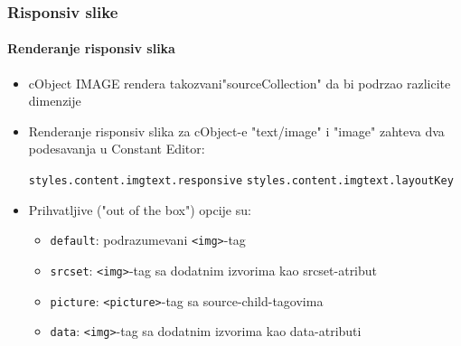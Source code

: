 \begin{frame}[fragile]
	\frametitle{Risponsiv slike}
	\framesubtitle{Renderanje risponsiv slika}

	\begin{itemize}
		\item cObject IMAGE rendera takozvani"sourceCollection" da bi podrzao razlicite dimenzije
		\item Renderanje risponsiv slika za cObject-e "text/image" i "image" zahteva dva podesavanja u Constant Editor:

			\texttt{styles.content.imgtext.responsive}\newline
			\texttt{styles.content.imgtext.layoutKey}

		\item Prihvatljive ("out of the box") opcije su:

			\begin{itemize}
				\item \texttt{default}:	\tabto{2cm} podrazumevani \texttt{<img>}-tag
				\item \texttt{srcset}:	\tabto{2cm} \texttt{<img>}-tag sa dodatnim izvorima kao srcset-atribut
				\item \texttt{picture}:	\tabto{2cm} \texttt{<picture>}-tag sa source-child-tagovima
				\item \texttt{data}:	\tabto{2cm} \texttt{<img>}-tag sa dodatnim izvorima kao data-atributi
			\end{itemize}

	\end{itemize}

\end{frame}



